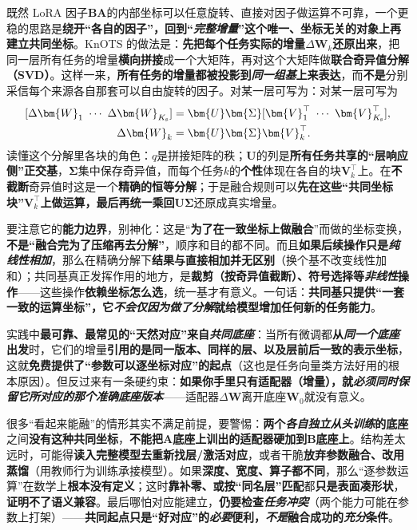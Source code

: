 既然 LoRA 因子$\bm{B}\bm{A}$的内部坐标可以任意旋转、直接对因子做运算不可靠，一个更稳的思路是\textbf{绕开“各自的因子”，回到“\emph{完整增量}”这个唯一、坐标无关的对象上再建立共同坐标}。KnOTS 的做法是：\textbf{先把每个任务实际的增量$\Delta\bm{W}_k$还原出来}，把同一层所有任务的增量\textbf{横向拼接}成一个大矩阵，再对这个大矩阵做\textbf{联合奇异值分解（SVD）}。这样一来，\textbf{所有任务的增量都被投影到\emph{同一组基}上来表达}，而\textbf{不是}分别采信每个来源各自那套可以自由旋转的因子。对某一层可写为：对某一层可写为
\begin{equation}
  \begin{aligned}
    \relax[\Delta\bm{W}_1\ \cdots\ \Delta\bm{W}_{K_{\mathrm{s}}}]
      &=\bm{U}\bm{\Sigma}[\bm{V}_1^\top\ \cdots\ \bm{V}_{K_{\mathrm{s}}}^\top],\\
    \Delta\bm{W}_k&=\bm{U}\bm{\Sigma}\bm{V}_k^\top.
  \end{aligned}
  \label{eq:ket-integration-knots}
\end{equation}
读懂这个分解里各块的角色：$q$是拼接矩阵的秩；$\bm{U}$的列是\textbf{所有任务共享的“层响应侧”正交基}，$\bm{\Sigma}$集中保存奇异值，而每个任务$k$的\textbf{个性}体现在各自的块$\bm{V}_k^\top$上。在\textbf{不截断}奇异值时这是一个\textbf{精确的恒等分解}；于是融合规则可以\textbf{先在这些“共同坐标块”$\bm{V}_k^\top$上做运算，最后再统一乘回$\bm{U}\bm{\Sigma}$}还原成真实增量。

要注意它的\textbf{能力边界}，别神化：这是“\textbf{为了在一致坐标上做融合}”而做的坐标变换，\textbf{不是“融合完为了压缩再去分解”}，顺序和目的都不同。而且\textbf{如果后续操作只是\emph{纯线性相加}}，那么在精确分解下\textbf{结果与直接相加并无区别}（换个基不改变线性加和）；共同基真正发挥作用的地方，是\textbf{裁剪（按奇异值截断）、符号选择等\emph{非线性}操作}——这些操作\textbf{依赖坐标怎么选}，统一基才有意义。一句话：\textbf{共同基只提供“一套一致的运算坐标”，它\emph{不会仅因为做了分解}就给模型增加任何新的任务能力}。

实践中\textbf{最可靠、最常见的“天然对应”来自\emph{共同底座}}：当所有微调都\textbf{从\emph{同一个底座}出发}时，它们的增量\textbf{引用的是同一版本、同样的层、以及层前后一致的表示坐标}，这就\textbf{免费提供了“参数可以逐坐标对应”的起点}（这也是任务向量类方法好用的根本原因）。但反过来有一条硬约束：\textbf{如果你手里只有适配器（增量），就\emph{必须同时保留它所对应的那个\emph{准确底座版本}}}——适配器$\Delta\bm{W}$离开底座$\bm{W}_0$就没有意义。

很多“看起来能融”的情形其实不满足前提，要警惕：\textbf{两个\emph{各自独立从头训练}的底座}之间\textbf{没有这种共同坐标}，\textbf{不能把A底座上训出的适配器硬加到B底座上}。结构差太远时，可能得\textbf{读入完整模型去重新找层/激活对应}，或者干脆\textbf{放弃参数融合、改用蒸馏}（用教师行为训练承接模型）。如果\textbf{深度、宽度、算子都不同}，那么“逐参数运算”在数学上\textbf{根本没有定义}；这时\textbf{靠补零、或按“同名层”匹配}都\textbf{只是表面凑形状}，\textbf{证明不了语义兼容}。最后哪怕对应能建立，\textbf{仍要检查\emph{任务冲突}}（两个能力可能在参数上打架）——\textbf{共同起点只是“好对应”的\emph{必要}便利，\emph{不是}融合成功的\emph{充分}条件}。

